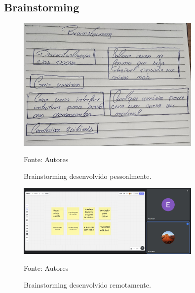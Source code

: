 \begin{apendicesenv}
\chapter{Brainstorming}
\label{cap:brainstorming}
    \begin{figure}[h]
        \centering
        \caption{Brainstorming desenvolvido pessoalmente.}
        \includegraphics[width=0.8\textwidth]{figuras/brainstorming-presencial.png}
        \begin{center}
            {\footnotesize Fonte: Autores}
        \end{center}
        \label{fig:brainstorming-pessoal}
    \end{figure}

    \begin{figure}[h]
        \centering
        \caption{Brainstorming desenvolvido remotamente.}
        \includegraphics[width=0.8\textwidth]{figuras/BrainsStorming online.png}
        \begin{center}
            {\footnotesize Fonte: Autores}
        \end{center}
        \label{fig:brainstorming-remoto}
    \end{figure}

\end{apendicesenv}
